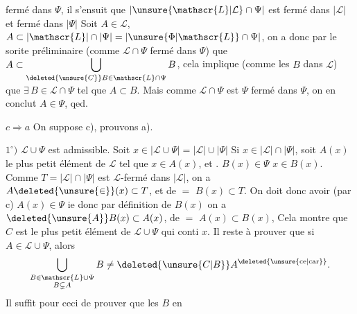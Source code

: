 fermé dans $\Psi$, il s'ensuit que $\lvert\unsure{\mathscr{L}|\mathcal{L}}\cap\Psi\rvert$ est fermé dans $\lvert\mathscr{L}\rvert$ et fermé dans $\lvert\Psi\rvert$ Soit $A\in\mathscr{L}$, $A\subset\lvert\mathscr{L}\rvert\cap\lvert\Psi\rvert=\lvert\unsure{\Phi|\mathscr{L}}\cap\Psi\rvert$, on a donc par le sorite préliminaire (comme $\mathscr{L}\cap\Psi$ fermé dans $\Psi$) que $A\subset\displaystyle\bigcup_{\deleted{\unsure{C}}B\in\mathscr{L}\cap\Psi}B$, cela implique  (comme les $B$ dans $\mathscr{L}$) que $\exists\,B\in\mathscr{L}\cap\Psi$ tel que $A\subset B$.
 Mais comme $\mathscr{L}\cap\Psi$ est $\Psi$ fermé dans $\Psi$, on en conclut $A\in\Psi$, qed.

$c\Longrightarrow a$ \quad On suppose c), prouvons a).

$1^\circ)$ $\mathscr{L}\cup\Psi$ est admissible. Soit $x\in\lvert\mathscr{L}\cup\Psi\rvert=\lvert\mathscr{L}\rvert\cup\lvert\Psi\rvert$  Si $x\in\lvert\mathscr{L}\rvert\cap\lvert\Psi\rvert$, soit $A(x)$ le plus petit élément de $\mathscr{L}$ tel que $x\in A(x)$, et . $B(x)\in\Psi$  $x\in B(x)$. Comme $T=\lvert\mathscr{L}\rvert\cap\lvert\Psi\rvert$ est $\mathscr{L}$-fermé dans $\lvert\mathscr{L}\rvert$, on a $A\deleted{\unsure{\in}}(x)\subset T$, et de $=$ $B(x)\subset T$. On doit donc avoir (par c) $A(x)\in\Psi$ ie  donc par définition de $B(x)$ on a $\deleted{\unsure{A}}B(x)\subset A(x)$, de $=$ $A(x)\subset B(x)$, 
  Cela montre que $C$ est le plus petit élément de $\mathscr{L}\cup\Psi$ qui conti $x$. Il reste à prouver que si $A\in\mathscr{L}\cup\Psi$, alors  \[
 \bigcup_{\substack{B\in\mathscr{L}\cup\Psi\\B\subsetneq A}}B
 \ne\deleted{\unsure{C|B}}A^{\text{\deleted{\unsure{ce|car}}}} .
\]  Il  suffit pour ceci de prouver que  les $B$ en
